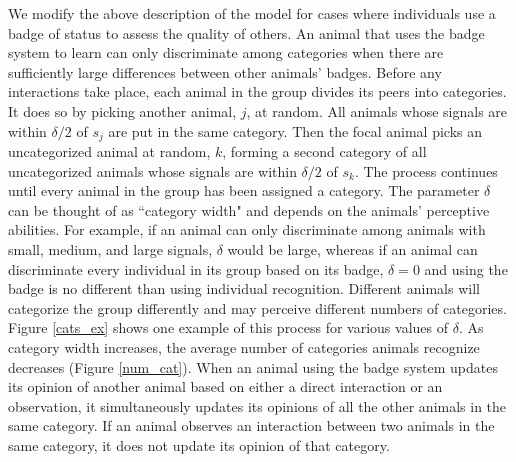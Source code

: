 We modify the above description of the model for cases where individuals use a badge of status to assess the quality of others. An animal that uses the badge system to learn can only discriminate among categories when there are sufficiently large differences between other animals' badges. Before any interactions take place, each animal in the group divides its peers into categories. It does so by picking another animal, $j$, at random. All animals whose signals are within $\delta/2$ of $s_j$ are put in the same category. Then the focal animal picks an uncategorized animal at random, $k$, forming a second category of all uncategorized animals whose signals are within $\delta/2$ of $s_k$. The process continues until every animal in the group has been assigned a category. The parameter $\delta$ can be thought of as ``category width" and depends on the animals' perceptive abilities. For example, if an animal can only discriminate among animals with small, medium, and large signals, $\delta$ would be large, whereas if an animal can discriminate every individual in its group based on its badge, $\delta=0$ and using the badge is no different than using individual recognition. Different animals will categorize the group differently and may perceive different numbers of categories. Figure \ref{cats_ex} shows one example of this process for various values of $\delta$. 
As category width increases, the average number of categories animals recognize decreases (Figure \ref{num_cat}). When an animal using the badge system updates its opinion of another animal based on either a direct interaction or an observation, it simultaneously updates its opinions of all the other animals in the same category. If an animal observes an interaction between two animals in the same category, it does not update its opinion of that category.

